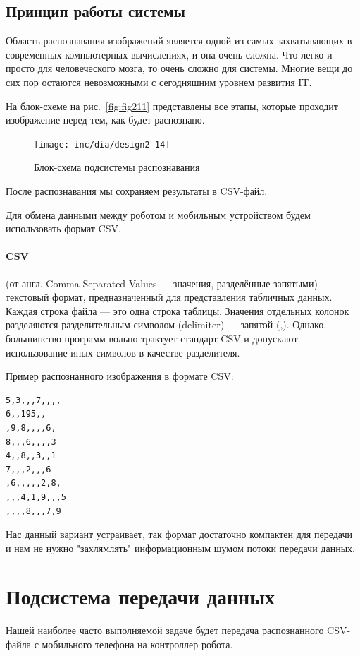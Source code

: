 \subsection{Принцип работы системы}
 Область распознавания изображений является одной из самых захватывающих в современных компьютерных вычислениях, и она очень сложна. Что легко и просто для человеческого мозга, то очень сложно для системы. Многие вещи до сих пор остаются невозможными с сегодняшним уровнем развития IT.

На блок-схеме на рис.~\ref{fig:fig211} представлены все этапы, которые проходит изображение перед тем, как будет распознано.
\begin{figure}[ht]
  \centering
  \texttt{[image: inc/dia/design2-14]}
  \caption{Блок-схема подсистемы распознавания}
  \label{fig:fig214}
\end{figure}

После распознавания мы сохраняем результаты в CSV-файл.

Для обмена данными между роботом и мобильным устройством будем использовать формат CSV.

\paragraph{CSV} (от англ. Comma-Separated Values — значения, разделённые запятыми) — текстовый формат, предназначенный для представления табличных данных. Каждая строка файла — это одна строка таблицы. Значения отдельных колонок разделяются разделительным символом (delimiter) — запятой (,). Однако, большинство программ вольно трактует стандарт CSV и допускают использование иных символов в качестве разделителя. 

Пример распознанного изображения в формате CSV:
\begin{lstlisting}[caption=CSV файл с заданием]
5,3,,,7,,,,
6,,195,,
,9,8,,,,6,
8,,,6,,,,3
4,,8,,3,,1
7,,,2,,,6
,6,,,,,2,8,
,,,4,1,9,,,5
,,,,8,,,7,9
\end{lstlisting}

Нас данный вариант устраивает, так формат достаточно компактен для передачи и нам не нужно "захлямлять" информационным шумом потоки передачи данных. 

\section{Подсистема передачи данных}

Нашей наиболее часто выполняемой задаче будет передача распознанного CSV-файла с мобильного телефона на контроллер робота.

